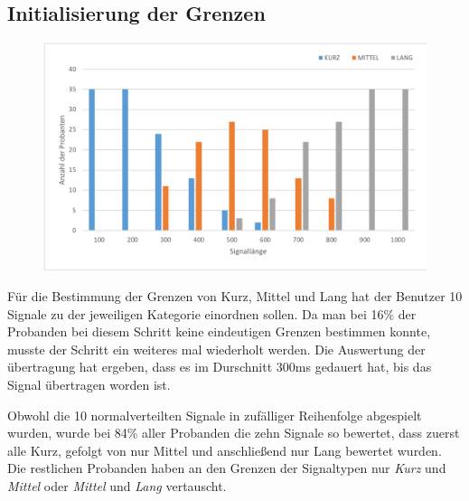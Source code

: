 \subsection{Initialisierung der Grenzen}
\label{ch:Evolution{\"a}rer Algorithmus:sec:Studiendesign}

\begin{figure}[htbp] 
            \centering
   	\includegraphics[width=\textwidth]{pics/analyse/Initialisierung.png}
	\caption{}
	\label{fig:Initialisierung}
\end{figure}

F{\"u}r die Bestimmung der Grenzen von Kurz, Mittel und Lang hat der Benutzer 10 Signale zu der jeweiligen Kategorie einordnen sollen. 
Da man bei 16\% der Probanden bei diesem Schritt keine eindeutigen Grenzen bestimmen konnte, musste der Schritt ein weiteres mal wiederholt werden. Die Auswertung der {\"u}bertragung hat ergeben, dass es im Durschnitt 300ms gedauert hat, bis das Signal {\"u}bertragen worden ist.

Obwohl die 10 normalverteilten Signale in zuf{\"a}lliger Reihenfolge abgespielt wurden, wurde bei 84\% aller Probanden die zehn Signale so bewertet, dass zuerst alle Kurz, gefolgt von nur Mittel und anschlie{\ss}end nur Lang bewertet wurden. 
Die restlichen Probanden haben an den Grenzen der Signaltypen nur \textit{Kurz} und \textit{Mittel} oder \textit{Mittel} und \textit{Lang} vertauscht.


